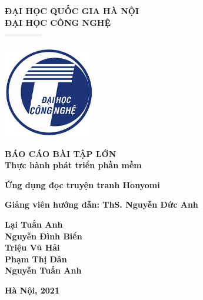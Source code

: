 \documentclass[./main.tex]{subfiles}
\begin{document}
\begin{titlepage}	
	\begin{center}
		\textbf{ĐẠI HỌC QUỐC GIA HÀ NỘI}\\
		\textbf{ĐẠI HỌC CÔNG NGHỆ}\\
		--------------
	
		\vspace*{30pt}
		
		\includegraphics[width=0.3\textwidth]{./images/uet.jpg}
		
		\vspace*{50pt}
		
		\textbf{BÁO CÁO BÀI TẬP LỚN 
			\\ Thực hành phát triển phần mềm}
		\vspace*{30pt}
		
		\textbf{Ứng dụng đọc truyện tranh Honyomi\\}

		\vspace*{50pt}
		
		\textbf{Giảng viên hướng dẫn: ThS. Nguyễn Đức Anh}
		
		\vspace*{30pt}
		
		\textbf{Lại Tuấn Anh\\
				Nguyễn Đình Biển\\
				Triệu Vũ Hải \\
				Phạm Thị Dân \\
				Nguyễn Tuấn Anh\\
		}
		
		\vspace*{40pt}
	\end{center}
	
	
	\begin{center}
		\textbf{Hà Nội, 2021}
	\end{center}
\end{titlepage}
\end{document}
